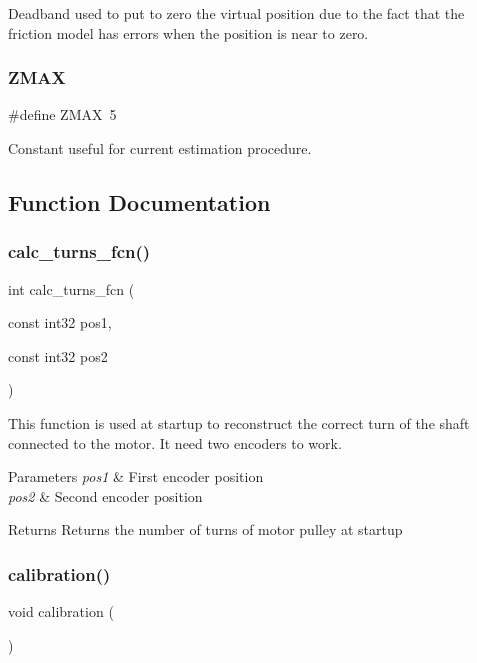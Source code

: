 Deadband used to put to zero the virtual position due to the fact that the friction model has errors when the position is near to zero. \mbox{\label{utils_8h_a131010b0d7e64a592f782aec28c6a4d8}} 
\subsubsection{Z\+M\+AX}
{\footnotesize\ttfamily \#define Z\+M\+AX~5}

Constant useful for current estimation procedure. 

\subsection{Function Documentation}
\mbox{\label{utils_8h_afa68f255d25478e463690f63d529c29d}} 
\subsubsection{calc\+\_\+turns\+\_\+fcn()}
{\footnotesize\ttfamily int calc\+\_\+turns\+\_\+fcn (\begin{DoxyParamCaption}\item[{const int32}]{pos1,  }\item[{const int32}]{pos2 }\end{DoxyParamCaption})}

This function is used at startup to reconstruct the correct turn of the shaft connected to the motor. It need two encoders to work.


\begin{DoxyParams}{Parameters}
{\em pos1} & First encoder position \\
\hline
{\em pos2} & Second encoder position\\
\hline
\end{DoxyParams}
\begin{DoxyReturn}{Returns}
Returns the number of turns of motor pulley at startup 
\end{DoxyReturn}
\mbox{\label{utils_8h_a6d9dc88d64cd1f74a30fd0e404a3bb31}} 
\subsubsection{calibration()}
{\footnotesize\ttfamily void calibration (\begin{DoxyParamCaption}{ }\end{DoxyParamCaption})}

